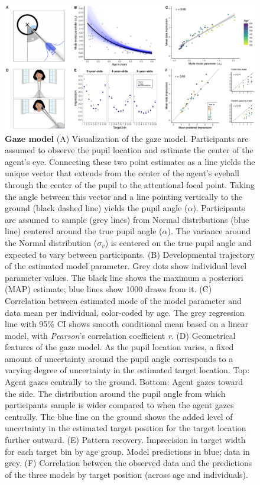 \documentclass[
  man,mask,floatsintext]{apa6}
\begin{document}
\begin{figure}

{\centering \includegraphics[width=1\linewidth]{../figures/gazemodel_plot} 

}

\caption{\textbf{Gaze model} (A) Visualization of the gaze model. Participants are assumed to observe the pupil location and estimate the center of the agent's eye. Connecting these two point estimates as a line yields the unique vector that extends from the center of the agent's eyeball through the center of the pupil to the attentional focal point. Taking the angle between this vector and a line pointing vertically to the ground (black dashed line) yields the pupil angle (\(\alpha\)). Participants are assumed to sample (grey lines) from Normal distributions (blue line) centered around the true pupil angle (\(\alpha\)). The variance around the Normal distribution (\(\sigma_v\)) is centered on the true pupil angle and expected to vary between participants. (B) Developmental trajectory of the estimated model parameter. Grey dots show individual level parameter values. The black line shows the maximum a posteriori (MAP) estimate; blue lines show 1000 draws from it. (C) Correlation between estimated mode of the model parameter and data mean per individual, color-coded by age. The grey regression line with 95\% CI shows smooth conditional mean based on a linear model, with \emph{Pearson}'s correlation coefficient \emph{r}. (D) Geometrical features of the gaze model. As the pupil location varies, a fixed amount of uncertainty around the pupil angle corresponds to a varying degree of uncertainty in the estimated target location. Top: Agent gazes centrally to the ground. Bottom: Agent gazes toward the side. The distribution around the pupil angle from which participants sample is wider compared to when the agent gazes centrally. The blue line on the ground shows the added level of uncertainty in the estimated target position for the target location further outward. (E) Pattern recovery. Imprecision in target width for each target bin by age group. Model predictions in blue; data in grey. (F) Correlation between the observed data and the predictions of the three models by target position (across age and individuals).}\label{fig:fig2}
\end{figure}
\end{document}
